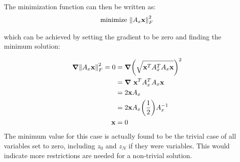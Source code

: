 \documentclass[letter]{article}
\begin{document}
The minimization function can then be written as:
\begin{align*}
	\text{minimize} \ \norm{A_x \vb{x}}_F^2
\end{align*}

which can be achieved by setting the gradient to be zero and finding the minimum solution:

\begin{align*}
	\grad{\norm{A_x \vb{x}}_F^2} = 0
	&= \grad{\qty(\sqrt{\vb{x}^T A_x^T A_x \vb{x}})^2}\\
	&= \grad{\ \vb{x}^T A_x^T A_x \vb{x}}\\ 
	&= 2 \vb{x} A_x\\
	&= 2 \vb{x} A_x \qty(\frac{1}{2}) A_x^{-1}\\
	\vb{x} &= 0
\end{align*}
The minimum value for this case is actually found to be the trivial case of all variables set to zero, including $z_0$ and $z_N$ if they were variables. This would indicate more restrictions are needed for a non-trivial solution.




\newpage


\end{document}
